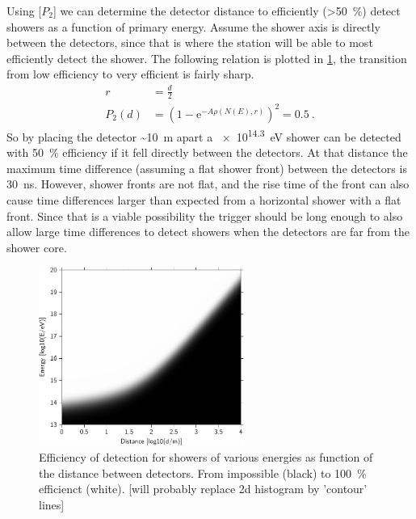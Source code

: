 Using [$P_2$] we can determine the detector distance to efficiently (\SI{>50}{\percent}) detect showers as a function of primary energy. Assume the shower axis is directly between the detectors, since that is where the station will be able to most efficiently detect the shower. The following relation is plotted in \cref{fig:efficiency_distance_energy}, the transition from low efficiency to very efficient is fairly sharp.
%
\begin{equation}
\begin{split}
    r &= \frac{d}{2} \\
    P_2(d) &= \left(1 - \mathrm{e}^{-A \rho(N(E), r)} \right)^2 = 0.5 \ .
\end{split}
\end{equation}
%
So by placing the detector \SI{~10}{\meter} apart a \SI{e14.3}{\eV} shower can be detected with \SI{50}{\percent} efficiency if it fell directly between the detectors. At that distance the maximum time difference (assuming a flat shower front) between the detectors is \SI{30}{\ns}. However, shower fronts are not flat, and the rise time of the front can also cause time differences larger than expected from a horizontal shower with a flat front. Since that is a viable possibility the trigger should be long enough to also allow large time differences to detect showers when the detectors are far from the shower core.

\begin{figure}
    \centering
    \includegraphics[width=0.6\textwidth]
                    {plots/station/efficiency_distance_energy}
    \caption{Efficiency of detection for showers of various energies as function of the distance between detectors. From impossible (black) to \SI{100}{\percent} efficienct (white). [will probably replace 2d histogram by 'contour' lines]}
    \label{fig:efficiency_distance_energy}
\end{figure}

